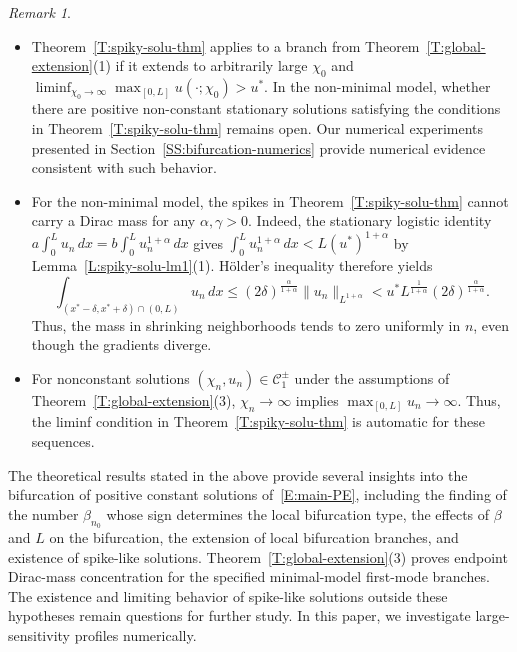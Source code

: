 \documentclass[11pt]{article} %
\theoremstyle{remark}
\newtheorem{remark}{Remark}[section]
\theoremstyle{remark}
\numberwithin{equation}{section}
\numberwithin{figure}{section}
\numberwithin{table}{section}
\begin{document}
\begin{remark}\label{R:spike-solution-rk}

  \begin{itemize}
    \item[(1)] Theorem~\ref{T:spiky-solu-thm} applies to a branch from
      Theorem~\ref{T:global-extension}(1) if it extends to arbitrarily large
      $\chi_0$ and $\liminf_{\chi_0\to\infty}\max_{[0,L]}u(\cdot;\chi_0) > u^*$.
      In the non-minimal model, whether there are positive non-constant
      stationary solutions satisfying the conditions in
      Theorem~\ref{T:spiky-solu-thm} remains open. Our numerical experiments
      presented in Section~\ref{SS:bifurcation-numerics} provide numerical
      evidence consistent with such behavior.


    \item[(2)] For the non-minimal model, the spikes in
      Theorem~\ref{T:spiky-solu-thm} cannot carry a Dirac mass for any $\alpha,
      \gamma > 0$. Indeed, the stationary logistic identity $ a\int_0^L u_n\,dx
      = b\int_0^L u_n^{1+\alpha}\,dx$ gives $\int_0^L u_n^{1+\alpha}\,dx <
      L\left(u^*\right)^{1+\alpha}$ by Lemma~\ref{L:spiky-solu-lm1}(1).
      H\"older's inequality therefore yields
      \begin{equation*}%
        \int_{(x^*-\delta,x^*+\delta)\cap(0,L)}u_n\,dx
        \le(2\delta)^{\frac{\alpha}{1+\alpha}}\|u_n\|_{L^{1+\alpha}}
        <u^* L^{\frac{1}{1+\alpha}}(2\delta)^{\frac{\alpha}{1+\alpha}}.
      \end{equation*}
      Thus, the mass in shrinking neighborhoods tends to zero uniformly in $n$,
      even though the gradients diverge.

    \item[(3)]   For nonconstant solutions $(\chi_n,u_n) \in
      \mathcal{C}_1^{\pm}$ under the assumptions of
      Theorem~\ref{T:global-extension}(3), $\chi_n \to \infty$ implies $
      \max_{[0,L]}u_n \longrightarrow \infty$. Thus, the liminf condition in
      Theorem~\ref{T:spiky-solu-thm} is automatic for these sequences.
  \end{itemize}
\end{remark}


The theoretical results stated in the above provide several insights into the
bifurcation of positive constant solutions of~\eqref{E:main-PE}, including the
finding of the number $\beta_{n_0}$ whose sign determines the local bifurcation
type, the effects of $\beta$ and $L$ on the bifurcation, the extension of local
bifurcation branches, and existence of spike-like solutions.
Theorem~\ref{T:global-extension}(3) proves endpoint Dirac-mass concentration for
the specified minimal-model first-mode branches. The existence and limiting
behavior of spike-like solutions outside these hypotheses remain questions for
further study. In this paper, we investigate large-sensitivity profiles
numerically.
\end{document}
